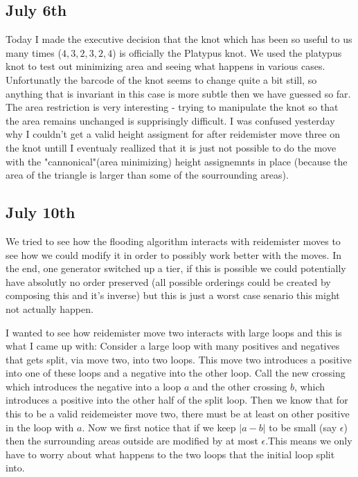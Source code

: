 \documentclass[11pt,oneside]{amsart}
\begin{document}
\subsection{July 6th}

Today I made the executive decision that the knot which has been so useful to us many times ($4, 3, 2, 3, 2, 4$) is officially the Platypus knot. We used the platypus knot to test out minimizing area and seeing what happens in various cases. Unfortunatly the barcode of the knot seems to change quite a bit still, so anything that is invariant in this case is more subtle then we have guessed so far. The area restriction is very interesting - trying to manipulate the knot so that the area remains unchanged is supprisingly difficult. I was confused yesterday why I couldn't get a valid height assigment for after reidemister move three on the knot untill I eventualy reallized that it is just not possible to do the move with the "cannonical"(area minimizing) height assignemnts in place (because the area of the triangle is larger than some of the sourrounding areas). 





\subsection{July 10th}


We tried to see how the flooding algorithm interacts with reidemister moves to see how we could modify it in order to possibly work better with the moves. In the end, one generator switched up a tier, if this is possible we could potentially have absolutly no order preserved (all possible orderings could be created by composing this and it's inverse) but this is just a worst case senario this might not actually happen.



I wanted to see how reidemister move two interacts with large loops and this is what I came up with: Consider a large loop with many positives and negatives that gets split, via move two, into two loops. This move two introduces a positive into one of these loops and a negative into the other loop. Call the new crossing which introduces the negative into a loop $a$ and the other crossing $b$, which introduces a positive into the other half of the split loop. Then we know that for this to be a valid reidemeister move two, there must be at least on other positive in the loop with $a$. Now we first notice that if we keep $|a - b|$ to be small (say $\epsilon$) then the surrounding areas outside are modified by at most $\epsilon$.This means we only have to worry about what happens to the two loops that the initial loop split into. 
\end{document}

